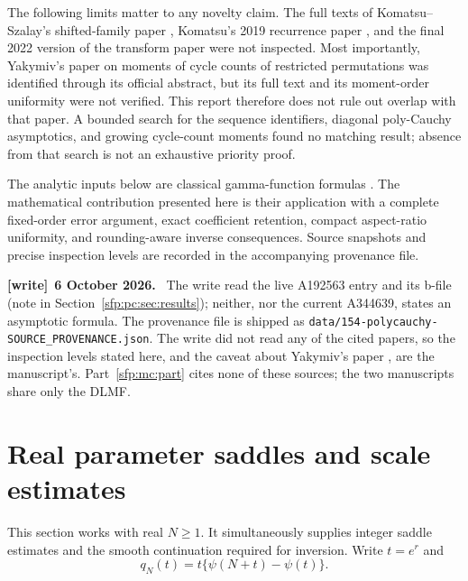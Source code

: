 \documentclass[11pt,letterpaper]{article}
\numberwithin{equation}{section}
\theoremstyle{definition}\newtheorem{definition}[theorem]{Definition}
\theoremstyle{remark}\newtheorem{remark}[theorem]{Remark}
\newcommand{\file}[1]{\nolinkurl{#1}}
\newenvironment{writenote}[1][]{\par\smallskip\begingroup\small
 \noindent\textbf{[write]}\if\relax\detokenize{#1}\relax\else~\textbf{#1.}\fi\ }%
 {\par\endgroup\smallskip}
\begin{document}
The following limits matter to any novelty claim. The full texts of
Komatsu--Szalay's shifted-family paper \cite{shifted}, Komatsu's
2019 recurrence paper \cite{recurrence}, and the final 2022 version
of the transform paper were not inspected. Most importantly,
Yakymiv's paper on moments of cycle counts of restricted permutations
\cite{yakymiv} was identified through its official abstract, but its
full text and its moment-order uniformity were not verified. This
report therefore does not rule out overlap with that paper. A
bounded search for the sequence identifiers, diagonal poly-Cauchy
asymptotics, and growing cycle-count moments found no matching
result; absence from that search is not an exhaustive priority proof.

The analytic inputs below are classical gamma-function formulas
\cite{dlmf}. The mathematical contribution presented here is their
application with a complete fixed-order error argument, exact
coefficient retention, compact aspect-ratio uniformity, and
rounding-aware inverse consequences. Source snapshots and precise
inspection levels are recorded in the accompanying provenance file.
\begin{writenote}[6 October 2026]
The write read the live A192563 entry and its b-file (note in Section~\ref{sfp:pc:sec:results}); neither, nor the current A344639, states an asymptotic formula. The provenance file is shipped as \file{data/154-polycauchy-SOURCE_PROVENANCE.json}. The write did not read any of the cited papers, so the inspection levels stated here, and the caveat about Yakymiv's paper \cite{yakymiv}, are the manuscript's. Part~\ref{sfp:mc:part} cites none of these sources; the two manuscripts share only the DLMF.
\end{writenote}

\section{Real parameter saddles and scale estimates}\label{sfp:pc:sec:real}

This section works with real $N\geq1$. It simultaneously supplies
integer saddle estimates and the smooth continuation required for
inversion. Write $t=e^r$ and
\begin{equation}\label{sfp:pc:eq:q}
 q_N(t)=t\{\psi(N+t)-\psi(t)\}.
\end{equation}
\end{document}
